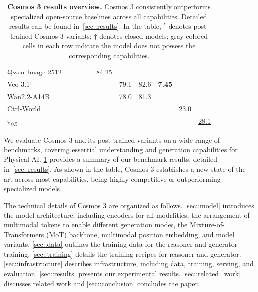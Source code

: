 \documentclass{llmxive}
\begin{document}
\begin{table}[t]
{\begin{tabular}{l|cccc|cccccc}
        Qwen-Image-2512 & \cellcolor{black!5} & \cellcolor{black!5} & \cellcolor{black!5} & \cellcolor{black!5} & 84.25 & \cellcolor{black!5} & \cellcolor{black!5} & \cellcolor{black!5} & \cellcolor{black!5} & \cellcolor{black!5} \\
        Veo-3.1$^\dagger$ & \cellcolor{black!5} & \cellcolor{black!5} & \cellcolor{black!5} & \cellcolor{black!5} & \cellcolor{black!5} & 79.1 & 82.6 & \textbf{7.45} & \cellcolor{black!5} & \cellcolor{black!5} \\
        Wan2.2-A14B & \cellcolor{black!5} & \cellcolor{black!5} & \cellcolor{black!5} & \cellcolor{black!5} & \cellcolor{black!5} & 78.0 & 81.3 & \cellcolor{black!5} & \cellcolor{black!5} & \cellcolor{black!5} \\
        Ctrl-World & \cellcolor{black!5} & \cellcolor{black!5} & \cellcolor{black!5} & \cellcolor{black!5} & \cellcolor{black!5} & \cellcolor{black!5} & \cellcolor{black!5} & \cellcolor{black!5} & 23.0 & \cellcolor{black!5} \\
        $\pi_{0.5}$ & \cellcolor{black!5} & \cellcolor{black!5} & \cellcolor{black!5} & \cellcolor{black!5} & \cellcolor{black!5} & \cellcolor{black!5} & \cellcolor{black!5} & \cellcolor{black!5} & \cellcolor{black!5} & \underline{28.1} \\
        \bottomrule
    \end{tabular}%
    }
\caption{\textbf{Cosmos 3 results overview.} Cosmos 3 consistently outperforms specialized open-source baselines across all capabilities. Detailed results can be found in~\cref{sec::results}. In the table, $^\ast$ denotes post-trained Cosmos 3 variants; $\dagger$ denotes closed models; gray-colored cells in each row indicate the model does not possess the corresponding capabilities.}
\label{tab:results_overview}
\end{table}


We evaluate Cosmos 3 and its post-trained variants on a wide range of benchmarks, covering essential understanding and generation capabilities for Physical AI. \cref{tab:results_overview} provides a summary of our benchmark results, detailed in~\cref{sec::results}. As shown in the table, Cosmos 3 establishes a new state-of-the-art across most capabilities, being highly competitive or outperforming specialized models. 


The technical details of Cosmos 3 are organized as follows.
\cref{sec::model} introduces the model architecture, including encoders for all modalities, the arrangement of multimodal tokens to enable different generation modes, the Mixture-of-Transformers (MoT) backbone, multimodal position embedding, and model variants.
\cref{sec::data} outlines the training data for the reasoner and generator training.
\cref{sec::training} details the training recipes for reasoner and generator.
\cref{sec::infrastructure} describes infrastructure, including data, training, serving, and evaluation.
\cref{sec::results} presents our experimental results.
\cref{sec::related_work} discusses related work and \cref{sec::conclusion} concludes the paper.
\end{document}
